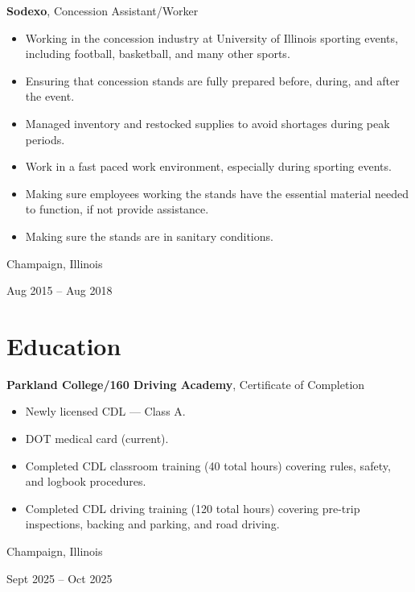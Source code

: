 \documentclass[10pt, letterpaper]{article}
\newenvironment{highlights}{
    \begin{itemize}[
        topsep=0.10 cm,
        parsep=0.10 cm,
        partopsep=0pt,
        itemsep=0pt,
        leftmargin=0.4 cm + 10pt
    ]
}{
    \end{itemize}
} %
\newenvironment{twocolentry}[2][]{
    \onecolentry
    \def\secondColumn{#2}
    \setcolumnwidth{\fill, 4.5 cm}
    \begin{paracol}{2}
}{
    \switchcolumn \raggedleft \secondColumn
    \end{paracol}
    \endonecolentry
} %
\newenvironment{threecolentry}[3][]{
    \onecolentry
    \def\thirdColumn{#3}
    \setcolumnwidth{1 cm, \fill, 4.5 cm}
    \begin{paracol}{3}
    {\raggedright #2} \switchcolumn
}{
    \switchcolumn \raggedleft \thirdColumn
    \end{paracol}
    \endonecolentry
} %
\begin{document}
        \vspace{0.2 cm}

        \begin{twocolentry}{
            Champaign, Illinois

        Aug 2015 – Aug 2018
        }
            \textbf{Sodexo}, Concession Assistant/Worker
            \begin{highlights}
                \item Working in the concession industry at University of Illinois sporting events, including football, basketball, and many other sports.
                \item Ensuring that concession stands are fully prepared before, during, and after the event.
                \item Managed inventory and restocked supplies to avoid shortages during peak periods.
                \item Work in a fast paced work environment, especially during sporting events.
                \item Making sure employees working the stands have the essential material needed to function, if not provide assistance.
                \item Making sure the stands are in sanitary conditions.
            \end{highlights}
        \end{twocolentry}



    
    \section{Education}



        
        \begin{threecolentry}{\textbf{}}{
            Champaign, Illinois

        Sept 2025 – Oct 2025
        }
            \textbf{Parkland College/160 Driving Academy}, Certificate of Completion
            \begin{highlights}
                \item Newly licensed CDL — Class A.
                \item DOT medical card (current).
                \item Completed CDL classroom training (40 total hours) covering rules, safety, and logbook procedures.
                \item Completed CDL driving training (120 total hours) covering pre-trip inspections, backing and parking, and road driving.
            \end{highlights}
        \end{threecolentry}
\end{document}
